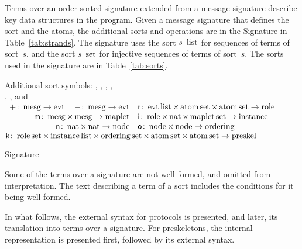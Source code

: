 \documentclass[12pt]{report}
\theoremstyle{definition}
\begin{document}
Terms over an order-sorted signature extended from a message signature
describe key data structures in the {\cpsa} program.  Given a message
signature that defines the sort  and the atoms, the
additional sorts and operations are in the {\cpsa} Signature in
Table~\ref{tab:strands}.  The signature uses the sort $s~\operatorname{\mathrm{list}}$
for sequences of terms of sort~$s$, and the sort $s~\operatorname{\mathrm{set}}$ for
injective sequences of terms of sort~$s$.  The sorts used in the
signature are in Table~\ref{tab:sorts}.

\begin{table}
\begin{center}
Additional sort symbols: , ,
, , \\
, , and  \\[1ex]
$\begin{array}{rl}
\outbnd\colon\dom{mesg}\rightarrow\dom{evt}\hspace{2\arraycolsep}
\inbnd\colon\dom{mesg}\rightarrow\dom{evt}&
\cn{r}\colon\dom{evt}\dom{list}\times\dom{atom}\dom{set}\times
\dom{atom}\dom{set}\rightarrow\dom{role}\\
\cn{m}\colon\dom{mesg}\times\dom{mesg}\rightarrow\dom{maplet}&
\cn{i}\colon\dom{role}\times\dom{nat}\times\dom{maplet}\dom{set}
\rightarrow\dom{instance}\\
\cn{n}\colon\dom{nat}\times\dom{nat}\rightarrow\dom{node}
&\cn{o}\colon\dom{node}\times\dom{node}\rightarrow\dom{ordering}
\end{array}$\\
$\operatorname{\mathsf{k}}\colon\operatorname{\mathrm{role}}\operatorname{\mathrm{set}}\times
\operatorname{\mathrm{instance}}\operatorname{\mathrm{list}}\times
\operatorname{\mathrm{ordering}}\operatorname{\mathrm{set}}\times\operatorname{\mathrm{atom}}\operatorname{\mathrm{set}}\times
\operatorname{\mathrm{atom}}\operatorname{\mathrm{set}}\rightarrow\operatorname{\mathrm{preskel}}$\\[1ex]
\end{center}
\caption{{\cpsa} Signature}\label{tab:strands}
\end{table}

Some of the terms over a {\cpsa} signature are not
well-formed, and omitted from interpretation.  The
text describing a term of a sort includes the conditions for it being
well-formed.

In what follows, the external syntax for protocols is presented, and
later, its translation into terms over a {\cpsa} signature.  For
preskeletons, the internal representation is presented first, followed
by its external syntax.
\end{document}
